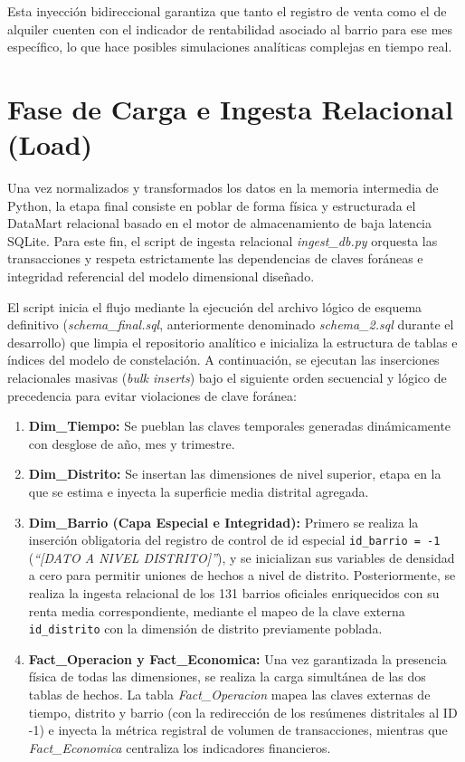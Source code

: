 \documentclass[a4paper,11pt,openany]{book}
\begin{document}
Esta inyección bidireccional garantiza que tanto el registro de venta como el de alquiler cuenten con el indicador de rentabilidad asociado al barrio para ese mes específico, lo que hace posibles simulaciones analíticas complejas en tiempo real.

\section{Fase de Carga e Ingesta Relacional (Load)}
Una vez normalizados y transformados los datos en la memoria intermedia de Python, la etapa final consiste en poblar de forma física y estructurada el DataMart relacional basado en el motor de almacenamiento de baja latencia SQLite. Para este fin, el script de ingesta relacional \textit{ingest\_db.py} orquesta las transacciones y respeta estrictamente las dependencias de claves foráneas e integridad referencial del modelo dimensional diseñado.

El script inicia el flujo mediante la ejecución del archivo lógico de esquema definitivo (\textit{schema\_final.sql}, anteriormente denominado \textit{schema\_2.sql} durante el desarrollo) que limpia el repositorio analítico e inicializa la estructura de tablas e índices del modelo de constelación. A continuación, se ejecutan las inserciones relacionales masivas (\textit{bulk inserts}) bajo el siguiente orden secuencial y lógico de precedencia para evitar violaciones de clave foránea:
\begin{enumerate}
    \item \textbf{Dim\_Tiempo:} Se pueblan las claves temporales generadas dinámicamente con desglose de año, mes y trimestre.
    \item \textbf{Dim\_Distrito:} Se insertan las dimensiones de nivel superior, etapa en la que se estima e inyecta la superficie media distrital agregada.
    \item \textbf{Dim\_Barrio (Capa Especial e Integridad):} Primero se realiza la inserción obligatoria del registro de control de id especial \texttt{id\_barrio = -1} (\textit{``[DATO A NIVEL DISTRITO]''}), y se inicializan sus variables de densidad a cero para permitir uniones de hechos a nivel de distrito. Posteriormente, se realiza la ingesta relacional de los 131 barrios oficiales enriquecidos con su renta media correspondiente, mediante el mapeo de la clave externa \texttt{id\_distrito} con la dimensión de distrito previamente poblada.
    \item \textbf{Fact\_Operacion y Fact\_Economica:} Una vez garantizada la presencia física de todas las dimensiones, se realiza la carga simultánea de las dos tablas de hechos. La tabla \textit{Fact\_Operacion} mapea las claves externas de tiempo, distrito y barrio (con la redirección de los resúmenes distritales al ID -1) e inyecta la métrica registral de volumen de transacciones, mientras que \textit{Fact\_Economica} centraliza los indicadores financieros.
\end{enumerate}
\end{document}

